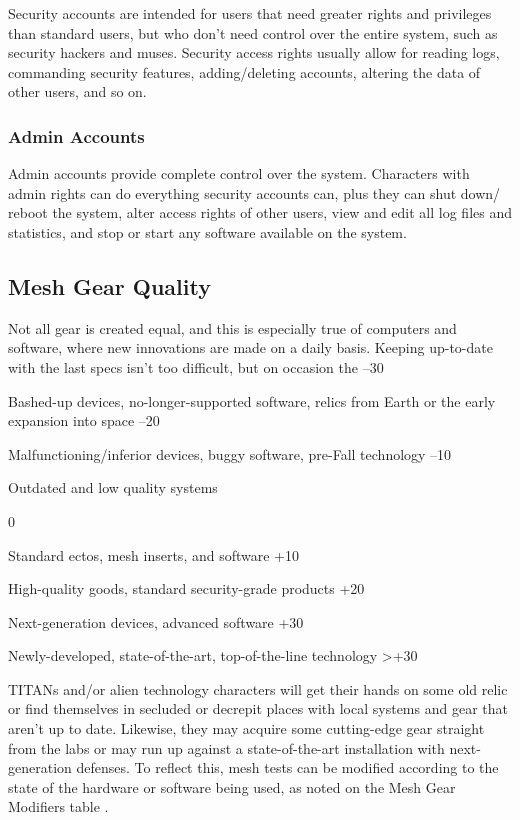 Security accounts are intended for users that need 
greater rights and privileges than standard users, but 
who don't need control over the entire system, such 
as security hackers and muses. Security access rights 
usually allow for reading logs, commanding security 
features, adding/deleting accounts, altering the data of 
other users, and so on.

\subsubsection{Admin Accounts}

Admin accounts provide complete control over the 
system. Characters with admin rights can do everything
security accounts can, plus they can shut down/
reboot the system, alter access rights of other users, 
view and edit all log files and statistics, and stop or 
start any software available on the system.

\subsection{Mesh Gear Quality}

Not all gear is created equal, and this is especially true 
of computers and software, where new innovations 
are made on a daily basis. Keeping up-to-date with 
the last specs isn't too difficult, but on occasion the 
–30

Bashed-up devices, no-longer-supported software, relics from Earth or the early expansion into space
–20

Malfunctioning/inferior devices, buggy software, pre-Fall technology
–10

Outdated and low quality systems

0

Standard ectos, mesh inserts, and software
+10

High-quality goods, standard security-grade products
+20

Next-generation devices, advanced software
+30

Newly-developed, state-of-the-art, top-of-the-line technology
>+30

TITANs and/or alien technology
characters will get their hands on some old relic or 
find themselves in secluded or decrepit places with 
local systems and gear that aren't up to date. Likewise, 
they may acquire some cutting-edge gear straight 
from the labs or may run up against a state-of-the-art 
installation with next-generation defenses. To reflect 
this, mesh tests can be modified according to the state 
of the hardware or software being used, as noted on 
the Mesh Gear Modifiers table
.

